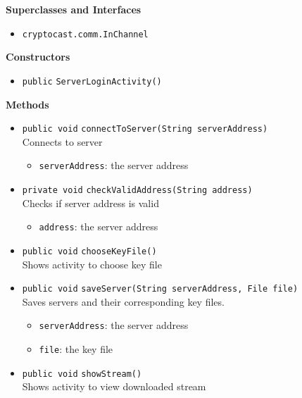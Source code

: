 \textbf{Superclasses and Interfaces}
\begin{itemize}
\item \lstinline|cryptocast.comm.InChannel|
\end{itemize}



\textbf{Constructors}
\begin{itemize}
\item \lstinline|public| \lstinline|ServerLoginActivity|\lstinline|()|




\end{itemize}


\textbf{Methods}
\begin{itemize}
\item \lstinline|public void| \lstinline|connectToServer|\lstinline|(String serverAddress)|\\
Connects to server
\begin{itemize}
\item \lstinline|serverAddress|: the server address
\end{itemize}



\item \lstinline|private void| \lstinline|checkValidAddress|\lstinline|(String address)|\\
Checks if server address is valid
\begin{itemize}
\item \lstinline|address|: the server address
\end{itemize}



\item \lstinline|public void| \lstinline|chooseKeyFile|\lstinline|()|\\
Shows activity to choose key file



\item \lstinline|public void| \lstinline|saveServer|\lstinline|(String serverAddress, File file)|\\
Saves servers and their corresponding key files.
\begin{itemize}
\item \lstinline|serverAddress|: the server address
\item \lstinline|file|: the key file
\end{itemize}



\item \lstinline|public void| \lstinline|showStream|\lstinline|()|\\
Shows activity to view downloaded stream




\end{itemize}
